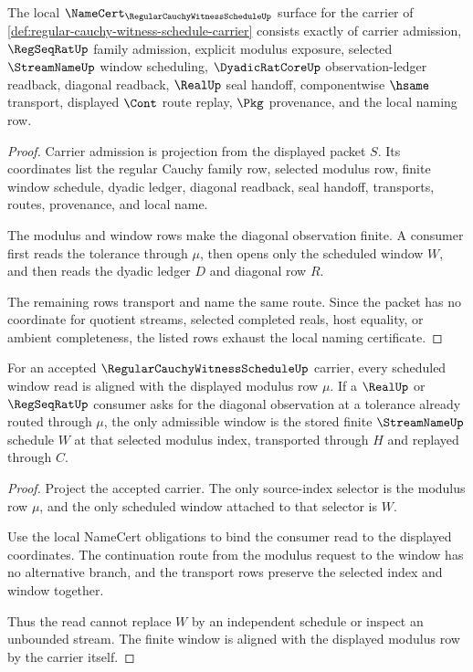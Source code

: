 \begin{theorem}
\label{thm:regular-cauchy-witness-schedule-namecert-obligations}
The local $\NameCert_{\RegularCauchyWitnessScheduleUp}$ surface for the carrier of \autoref{def:regular-cauchy-witness-schedule-carrier} consists exactly of carrier admission, $\RegSeqRatUp$ family admission, explicit modulus exposure, selected $\StreamNameUp$ window scheduling, $\DyadicRatCoreUp$ observation-ledger readback, diagonal readback, $\RealUp$ seal handoff, componentwise $\hsame$ transport, displayed $\Cont$ route replay, $\Pkg$ provenance, and the local naming row.
\end{theorem}
\begin{proof}
Carrier admission is projection from the displayed packet $S$. Its coordinates list the regular Cauchy family row, selected modulus row, finite window schedule, dyadic ledger, diagonal readback, seal handoff, transports, routes, provenance, and local name.

The modulus and window rows make the diagonal observation finite. A consumer first reads the tolerance through $\mu$, then opens only the scheduled window $W$, and then reads the dyadic ledger $D$ and diagonal row $R$.

The remaining rows transport and name the same route. Since the packet has no coordinate for quotient streams, selected completed reals, host equality, or ambient completeness, the listed rows exhaust the local naming certificate.
\end{proof}

\begin{theorem}
\label{thm:regular-cauchy-witness-schedule-window-modulus-alignment}
For an accepted $\RegularCauchyWitnessScheduleUp$ carrier, every scheduled window read is aligned with the displayed modulus row $\mu$. If a $\RealUp$ or $\RegSeqRatUp$ consumer asks for the diagonal observation at a tolerance already routed through $\mu$, the only admissible window is the stored finite $\StreamNameUp$ schedule $W$ at that selected modulus index, transported through $H$ and replayed through $C$.
\end{theorem}
\begin{proof}
Project the accepted carrier. The only source-index selector is the modulus row $\mu$, and the only scheduled window attached to that selector is $W$.

Use the local NameCert obligations to bind the consumer read to the displayed coordinates. The continuation route from the modulus request to the window has no alternative branch, and the transport rows preserve the selected index and window together.

Thus the read cannot replace $W$ by an independent schedule or inspect an unbounded stream. The finite window is aligned with the displayed modulus row by the carrier itself.
\end{proof}

